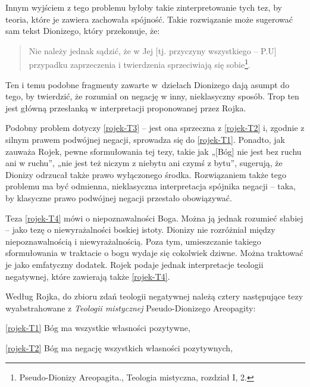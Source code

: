Innym wyjściem z tego problemu byłoby takie zinterpretowanie tych tez,
by teoria, które je zawiera zachowała spójność. Takie rozwiązanie może
sugerować sam tekst Dionizego, który przekonuje, że:

\begin{quote}
    Nie należy jednak sądzić, że w Jej [tj. przyczyny wszystkiego -- P.U]
przypadku zaprzeczenia i twierdzenia sprzeciwiają się
sobie\footnote{Pseudo-Dionizy Areopagita., Teologia mistyczna,
rozdział I, 2.}.
\end{quote}
Ten i temu podobne fragmenty zawarte w~dziełach Dionizego dają asumpt do tego, by twierdzić, że rozumiał on negację w inny, nieklasyczny sposób.
Trop ten jest główną przesłanką w interpretacji proponowanej przez
Rojka.

Podobny problem dotyczy \eqref{rojek-T3} -- jest ona sprzeczna z \eqref{rojek-T2} i, zgodnie z
silnym prawem podwójnej negacji, sprowadza się do \eqref{rojek-T1}. Ponadto, jak
zauważa Rojek, pewne sformułowania tej tezy, takie jak „[Bóg] nie jest
bez ruchu ani w ruchu”, „nie jest też niczym z niebytu ani czymś z
bytu”, sugerują, że Dionizy odrzucał także prawo wyłączonego środka.
Rozwiązaniem także tego problemu ma być odmienna, nieklasyczna
interpretacja spójnika negacji -- taka, by klasyczne prawo podwójnej
negacji przestało obowiązywać.

Teza \eqref{rojek-T4} mówi o niepoznawalności Boga. Można ją jednak rozumieć słabiej
– jako tezę o niewyrażalności boskiej istoty. Dionizy nie rozróżniał
między niepoznawalnością i niewyrażalnością. Poza tym, umieszczanie
takiego sformułowania w traktacie o bogu wydaje się cokolwiek dziwne.
Można traktować je jako emfatyczny dodatek. Rojek podaje jednak
interpretacje teologii negatywnej, które zawierają także \eqref{rojek-T4}.





Według Rojka, do zbioru zdań teologii negatywnej należą cztery
następujące tezy wyabstrahowane z \textit{Teologii mistycznej}
Pseudo-Dionizego Areopagity:


\bigskip

\noindent \eqref{rojek-T1} Bóg ma wszystkie własności pozytywne,

\noindent \eqref{rojek-T2} Bóg ma negację wszystkich własności pozytywnych,

